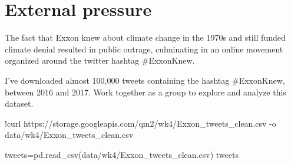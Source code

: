 \documentclass[
  letterpaper,
  DIV=11,
  numbers=noendperiod]{scrreprt}
\newenvironment{Shaded}{\begin{snugshade}}{\end{snugshade}}
\newcommand{\NormalTok}[1]{\textcolor[rgb]{0.00,0.23,0.31}{#1}}
\newcommand{\OperatorTok}[1]{\textcolor[rgb]{0.37,0.37,0.37}{#1}}
\newcommand{\StringTok}[1]{\textcolor[rgb]{0.13,0.47,0.30}{#1}}
\begin{document}

\hypertarget{external-pressure}{%
\chapter{External pressure}\label{external-pressure}}

The fact that Exxon knew about climate change in the 1970s and still
funded climate denial resulted in public outrage, culminating in an
online movement organized around the twitter hashtag \#ExxonKnew.

I've downloaded almost 100,000 tweets containing the hashtag
\#ExxonKnew, between 2016 and 2017. Work together as a group to explore
and analyze this dataset.

\begin{Shaded}
\begin{Highlighting}[]
\OperatorTok{!}\NormalTok{curl https:}\OperatorTok{//}\NormalTok{storage.googleapis.com}\OperatorTok{/}\NormalTok{qm2}\OperatorTok{/}\NormalTok{wk4}\OperatorTok{/}\NormalTok{Exxon\_tweets\_clean.csv }\OperatorTok{{-}}\NormalTok{o data}\OperatorTok{/}\NormalTok{wk4}\OperatorTok{/}\NormalTok{Exxon\_tweets\_clean.csv}
\end{Highlighting}
\end{Shaded}

\begin{Shaded}
\begin{Highlighting}[]
\NormalTok{tweets}\OperatorTok{=}\NormalTok{pd.read\_csv(}\StringTok{\textquotesingle{}data/wk4/Exxon\_tweets\_clean.csv\textquotesingle{}}\NormalTok{)}
\NormalTok{tweets}
\end{Highlighting}
\end{Shaded}
\end{document}

